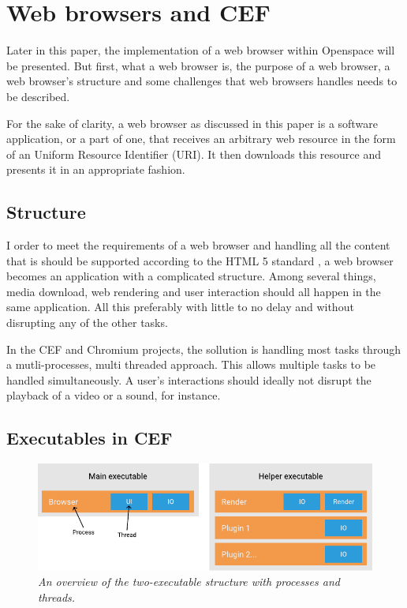 
\section{Web browsers and CEF}

Later in this paper, the implementation of a web browser within Openspace will be presented. But first, what a web browser is, the purpose of a web browser, a web browser's structure and some challenges that web browsers handles needs to be described.

For the sake of clarity, a web browser as discussed in this paper is a software application, or a part of one, that receives an arbitrary web resource in the form of an Uniform Resource Identifier (URI). \cite{jacobs2009uri} It then downloads this resource and presents it in an appropriate fashion.

\subsection{Structure}

I order to meet the requirements of a web browser and handling all the content that is should be supported according to the HTML 5 standard \cite{html}, a web browser becomes an application with a complicated structure. Among several things, media download, web rendering and user interaction should all happen in the same application. All this preferably with little to no delay and without disrupting any of the other tasks.

In the CEF and Chromium projects, the sollution is handling most tasks through a mutli-processes, multi threaded approach. This allows multiple tasks to be handled simultaneously. \cite{cefusage} A user's interactions should ideally not disrupt the playback of a video or a sound, for instance.

\subsection{Executables in CEF}

\begin{figure}[h]\label{fig:processes}
\centering
\includegraphics[width=0.9\linewidth]{./figures/process.pdf}
\caption{\emph{An overview of the two-executable structure with processes and threads.}}
\end{figure}

